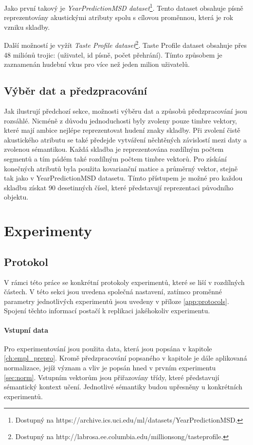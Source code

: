 \documentclass[thesis=M,czech]{FITthesis}[2012/06/26]
\begin{document}
Jako první takový je \textit{YearPredictionMSD dataset}\footnote{Dostupný na https://archive.ics.uci.edu/ml/datasets/YearPredictionMSD.}. Tento dataset obsahuje písně reprezentovány akustickými atributy spolu s cílovou proměnnou, která je rok vzniku skladby. 

Další možností je vyžít \textit{Taste Profile dataset}\footnote{Dostupný na http://labrosa.ee.columbia.edu/millionsong/tasteprofile.}. Taste Profile dataset obsahuje přes 48 miliónů trojic: (uživatel, id písně, počet přehrání). Tímto způsobem je zaznamenán hudební vkus pro více než jeden milion uživatelů.


\section{Výběr dat a předzpracování}
Jak ilustrují předchozí sekce, možnosti výběru dat a způsobů předzpracování jsou rozsáhlé. Nicméně z důvodu jednoduchosti byly zvoleny pouze timbre vektory, které mají ambice nejlépe reprezentovat hudení znaky skladby. Při zvolení čistě akustického atributu se také předejde vytváření něchtěných závislostí mezi daty a zvolenou sémantikou. Každá skladba je reprezentována rozdílným počtem segmentů a tím pádém také rozdílným počtem timbre vektorů. Pro získání konečných atributů byla použita kovarianční matice a průměrný vektor, stejně tak jako v YearPredictionMSD datasetu. Tímto přístupem je možné pro každou skladbu získat $90$ desetinných čísel, které představují reprezentaci původního objektu. 




\chapter{Experimenty}
\section{Protokol}

V rámci této práce se konkrétní protokoly experimentů, které se liší v rozdílných částech. V této sekci jsou uvedena společná nastavení, zatímco proměnné parametry jednotlivých experimentů jsou uvedeny v příloze \ref{app:protocols}. Spojení těchto informací postačí k replikaci jakéhokoliv experimentu.


\subsubsection*{Vstupní data}
Pro experimentování jsou použita data, která jsou popsána v kapitole \ref{ch:empl_prepro}. Kromě předzpracování popsaného v kapitole je dále aplikovaná normalizace, jejíž význam a vliv je popsán hned v prvním experimentu \ref{sec:norm}.
Vstupním vektorům jsou přiřazovány třídy, které představují sémantický kontext učení. Jednotlivé sémantiky budou upřesněny u konkrétních experimentů.
\end{document}
